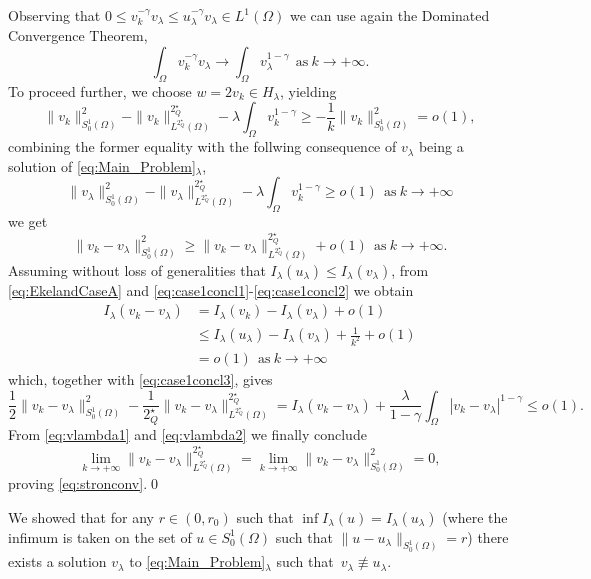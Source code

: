 \documentclass[11pt]{amsart}
\numberwithin{equation}{section} %
\theoremstyle{definition}
\newcommand{\m}{\mbox}
\newcommand{\fine}{\qed\newline}
\begin{document}
Observing that $0\leq v_k^{-\gamma}v_\lambda\leq u_\lambda^{-\gamma}v_\lambda\in L^1(\Omega)$
we can use again the Dominated Convergence Theorem,
\begin{equation}
	\int_\Omega v_k^{-\gamma}v_\lambda\to\int_\Omega v_\lambda^{1-\gamma}\ \ \m{as}\ k\to+\infty.
\end{equation}
To proceed further, we choose $w=2v_k\in H_\lambda$,
yielding
\[
\|v_k\|_{S^{1}_{0}(\Omega)}^2-\|v_k\|_{L^{2^\star_Q}(\Omega)}^{2^\star_Q}-\lambda\int_\Omega v_k^{1-\gamma}\geq-\frac{1}{k}\|v_k\|_{S^{1}_{0}(\Omega)}^2=o(1),
\]
combining the former equality
 with the follwing consequence of $v_\lambda$ being a solution of \eqref{eq:Main_Problem}$_\lambda$,
 \[
 \|v_\lambda\|_{S^{1}_{0}(\Omega)}^2-\|v_\lambda\|_{L^{2^\star_Q}(\Omega)}^{2^\star_Q}-\lambda\int_\Omega v_k^{1-\gamma}\geq o(1)\ \ \m{as}\ k\to+\infty
 \]
 we get
 \begin{equation}\label{eq:vlambda1}
 	\|v_k-v_\lambda\|_{S^{1}_{0}(\Omega)}^2\geq \|v_k-v_\lambda\|_{L^{2^\star_Q}(\Omega)}^{2^\star_Q}+o(1)\ \ \m{as}\ k\to+\infty.
 \end{equation}
 Assuming without loss of generalities that $I_\lambda(u_\lambda)\leq I_\lambda(v_\lambda)$,
 from \eqref{eq:EkelandCaseA} and \eqref{eq:case1concl1}-\eqref{eq:case1concl2}
 we obtain
 \[
 \begin{split}
 	I_\lambda(v_k-v_\lambda)&=I_\lambda(v_k)-I_\lambda(v_\lambda)+o(1)\\
 	&\leq I_\lambda(u_\lambda)-I_\lambda(v_\lambda)+\frac{1}{k^2}+o(1)\\
 	&=o(1)\ \ \m{as}\ k\to+\infty
 \end{split}
 \]
 which, together with \eqref{eq:case1concl3}, gives
 \begin{equation}\label{eq:vlambda2}
 	\frac{1}{2}\|v_k-v_\lambda\|_{S^{1}_{0}(\Omega)}^2-\frac{1}{2^\star_Q}\|v_k-v_\lambda\|^{2^\star_Q}_{L^{2^\star_Q}(\Omega)}=
 	I_\lambda(v_k-v_\lambda)+\frac{\lambda}{1-\gamma}\int_\Omega|v_k-v_\lambda|^{1-\gamma}\leq o(1).
 \end{equation}
 From \eqref{eq:vlambda1} and \eqref{eq:vlambda2}
 we finally conclude
 \[
 \lim_{k\to+\infty}\|v_k-v_\lambda\|_{L^{2^\star_Q}(\Omega)}^{2^\star_Q}=\lim_{k\to+\infty}\|v_k-v_\lambda\|_{S^{1}_{0}(\Omega)}^2=0,
 \]
 proving \eqref{eq:stronconv}.\fine
 
 We showed that for any $r\in (0,r_0)$ such that $\inf I_\lambda(u)=I_\lambda(u_\lambda)$
 (where the infimum is taken on the set of $u\in S^1_0(\Omega)$ such that $\|u-u_\lambda\|_{S^{1}_{0}(\Omega)}=r$)
 there exists a solution $v_\lambda$ to \eqref{eq:Main_Problem}$_\lambda$
 such that~$v_\lambda\not\equiv u_\lambda$.\newline
 
\end{document}
